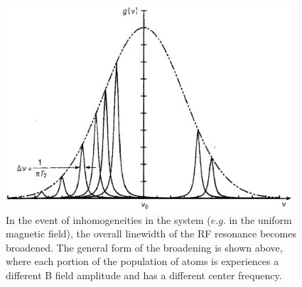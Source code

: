 \begin{figure}[h]
\begin{center}
\includegraphics[height=3in]{figures/inhomogeneous.eps}
\caption{\small{In the event of inhomogeneities in the system ($e.g.$ in the uniform magnetic field), the overall linewidth of the RF resonance becomes broadened. The general form of the broadening is shown above, where each portion of the population of atoms is experiences a different B field amplitude and has a different center frequency.}}
\label{fig:inhomo}
\end{center}
\end{figure}


